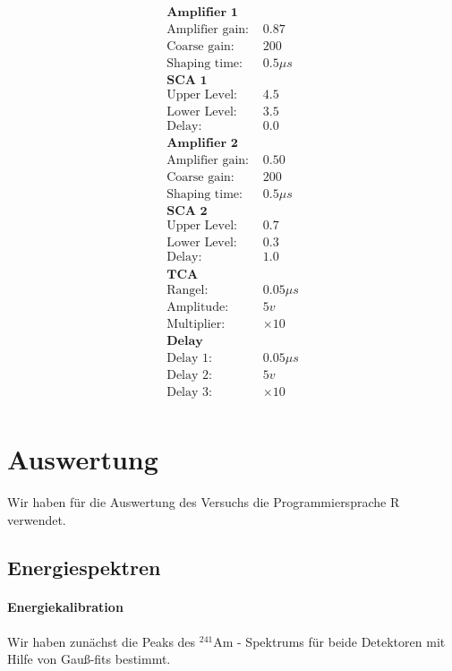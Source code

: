 \documentclass[12pt]{article}
\begin{document}
\begin{align*}
\textbf{Amplifier 1}\\
\text{Amplifier gain: } & 0.87\\
\text{Coarse gain: } & 200\\
\text{Shaping time: } & 0.5\mu s\\
\textbf{SCA 1}\\
\text{Upper Level: } & 4.5\\
\text{Lower Level: } & 3.5\\
\text{Delay: } & 0.0\\
\textbf{Amplifier 2}\\
\text{Amplifier gain: } & 0.50\\
\text{Coarse gain: } & 200\\
\text{Shaping time: } & 0.5\mu s\\
\textbf{SCA 2}\\
\text{Upper Level: } & 0.7\\
\text{Lower Level: } & 0.3\\
\text{Delay: } & 1.0\\
\textbf{TCA}\\
\text{Rangel: } & 0.05\mu s\\
\text{Amplitude: } & 5 v\\
\text{Multiplier: } & \times 10\\
\textbf{Delay}\\
\text{Delay 1: } & 0.05\mu s\\
\text{Delay 2: } & 5 v\\
\text{Delay 3: } & \times 10\\
\end{align*}


\newpage
\section{Auswertung}

Wir haben für die Auswertung des Versuchs die Programmiersprache R verwendet.

\subsection{Energiespektren}

\paragraph{Energiekalibration} Wir haben zunächst die Peaks des $^{241}$Am - Spektrums für beide Detektoren mit Hilfe von Gauß-fits bestimmt.
\end{document}
